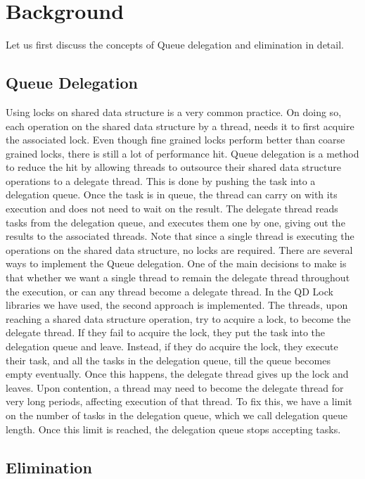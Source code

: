 \section{Background}
Let us first discuss the concepts of Queue delegation and elimination in detail.
\subsection{Queue Delegation}
Using locks on shared data structure is a very common practice. On doing so, each operation on the shared data structure by a thread, needs it to first acquire the associated lock. Even though fine grained locks perform better than coarse grained locks, there is still a lot of performance hit. Queue delegation is a method to reduce the hit by allowing threads to outsource their shared data structure operations to a delegate thread. This is done by pushing the task into a delegation queue. Once the task is in queue, the thread can carry on with its execution and does not need to wait on the result.
The delegate thread reads tasks from the delegation queue, and executes them one by one, giving out the results to the associated threads. Note that since a single thread is executing the operations on the shared data structure, no locks are required.
There are several ways to implement the Queue delegation. One of the main decisions to make is that whether we want a single thread to remain the delegate thread throughout the execution, or can any thread become a delegate thread. In the QD Lock libraries we have used, the second approach is implemented. The threads, upon reaching a shared data structure operation, try to acquire a lock, to become the delegate thread. If they fail to acquire the lock, they put the task into the delegation queue and leave. Instead, if they do acquire the lock, they execute their task, and all the tasks in the delegation queue, till the queue becomes empty eventually. Once this happens, the delegate thread gives up the lock and leaves. Upon contention, a thread may need to become the delegate thread for very long periods, affecting execution of that thread. To fix this, we have a limit on the number of tasks in the delegation queue, which we call delegation queue length. Once this limit is reached, the delegation queue stops accepting tasks.
\subsection{Elimination}


